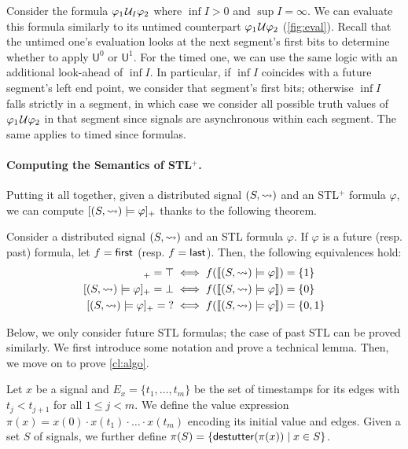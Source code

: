\bgroup \color{red}
\begin{remark}
	Consider the formula $\varphi_1 \kern.1em\mathcal{U}_I \varphi_2$ where $\inf I > 0$ and $\sup I = \infty$.
	We can evaluate this formula similarly to its untimed counterpart $\varphi_1 \kern.1em\mathcal{U} \varphi_2$ (\cref{fig:eval}).
	Recall that the untimed one's evaluation looks at the next segment's first bits to determine whether to apply $\mathsf{U}^0$ or $\mathsf{U}^1$.
	For the timed one, we can use the same logic with an additional look-ahead of $\inf I$.
	In particular, if $\inf I$ coincides with a future segment's left end point, we consider that segment's first bits; otherwise $\inf I$ falls strictly in a segment, in which case we consider all possible truth values of $\varphi_1 \kern.1em\mathcal{U} \varphi_2$ in that segment since signals are asynchronous within each segment.
	The same applies to timed since formulas.
\end{remark}
\egroup


\paragraph*{Computing the Semantics of STL$^+$.}

Putting it all together, given a distributed signal $(S, {\rightsquigarrow})$ and an STL$^+$ formula $\varphi$, we can compute $[(S,{\rightsquigarrow}) \models \varphi]_+$ thanks to the following theorem.

\bgroup \color{red}
\begin{theorem} \label{cl:algo}
	Consider a distributed signal $(S,{\rightsquigarrow})$ and an STL formula $\varphi$.
	If $\varphi$ is a future (resp. past) formula, let $f = \textsf{first}$ (resp. $f = \textsf{last}$).
	Then, the following equivalences hold:
	\begin{align*}
		[(S,{\hb}) \models \varphi]_+ = \top &\iff f(\llbracket (S, {\hb}) \models \varphi \rrbracket) = \{1\}\\
		[(S,{\hb}) \models \varphi]_+ = \bot &\iff f(\llbracket (S, {\hb}) \models \varphi \rrbracket) = \{0\}\\
		[(S,{\hb}) \models \varphi]_+ = {?} &\iff f(\llbracket (S, {\hb}) \models \varphi \rrbracket) = \{0,1\}
	\end{align*}
\end{theorem}

Below, we only consider future STL formulas; the case of past STL can be proved similarly.
We first introduce some notation and prove a technical lemma.
Then, we move on to prove \cref{cl:algo}. 

Let $x$ be a signal and $E_x = \{t_1, \ldots, t_m\}$ be the set of timestamps for its edges with $t_j < t_{j+1}$ for all $1 \leq j < m$.
We define the value expression $\pi(x) = x(0) \cdot x(t_1) \cdot \ldots \cdot x(t_m)$ encoding its initial value and edges.
Given a set $S$ of signals, we further define $\pi(S) = \{ \destutter(\pi(x)) \st x \in S \}$.

